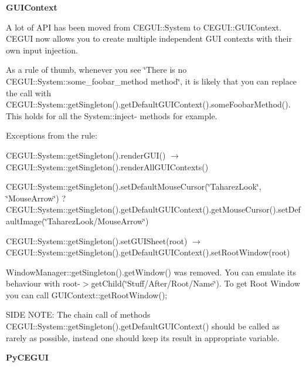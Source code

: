 {\bfseries{G\+U\+I\+Context }}

A lot of A\+PI has been moved from C\+E\+G\+U\+I\+::\+System to C\+E\+G\+U\+I\+::\+G\+U\+I\+Context. C\+E\+G\+UI now allows you to create multiple independent G\+UI contexts with their own input injection.

As a rule of thumb, whenever you see \char`\"{}\+There is no C\+E\+G\+U\+I\+::\+System\+::some\+\_\+foobar\+\_\+method method\char`\"{}, it is likely that you can replace the call with C\+E\+G\+U\+I\+::\+System\+::get\+Singleton().get\+Default\+G\+U\+I\+Context().some\+Foobar\+Method(). This holds for all the System\+::inject-\/ methods for example.

Exceptions from the rule\+:
\begin{DoxyItemize}
\item C\+E\+G\+U\+I\+::\+System\+::get\+Singleton().render\+G\+U\+I() {$\rightarrow$} C\+E\+G\+U\+I\+::\+System\+::get\+Singleton().render\+All\+G\+U\+I\+Contexts()
\item C\+E\+G\+U\+I\+::\+System\+::get\+Singleton().set\+Default\+Mouse\+Cursor(\char`\"{}\+Taharez\+Look\char`\"{}, \char`\"{}\+Mouse\+Arrow\char`\"{}) ? C\+E\+G\+U\+I\+::\+System\+::get\+Singleton().get\+Default\+G\+U\+I\+Context().get\+Mouse\+Cursor().set\+Default\+Image(\char`\"{}\+Taharez\+Look/\+Mouse\+Arrow\char`\"{})
\item C\+E\+G\+U\+I\+::\+System\+::get\+Singleton().set\+G\+U\+I\+Sheet(root) {$\rightarrow$} C\+E\+G\+U\+I\+::\+System\+::get\+Singleton().get\+Default\+G\+U\+I\+Context().set\+Root\+Window(root)
\end{DoxyItemize}

Window\+Manager\+::get\+Singleton().get\+Window() was removed. You can emulate its behaviour with root-\/$>$get\+Child(\char`\"{}\+Stuff/\+After/\+Root/\+Name\char`\"{}). To get Root Window you can call G\+U\+I\+Context\+::get\+Root\+Window();

S\+I\+DE N\+O\+TE\+: The chain call of methods C\+E\+G\+U\+I\+::\+System\+::get\+Singleton().get\+Default\+G\+U\+I\+Context() should be called as rarely as possible, instead one should keep it\textquotesingle{}s result in appropriate variable.

{\bfseries{ Py\+C\+E\+G\+UI }}


